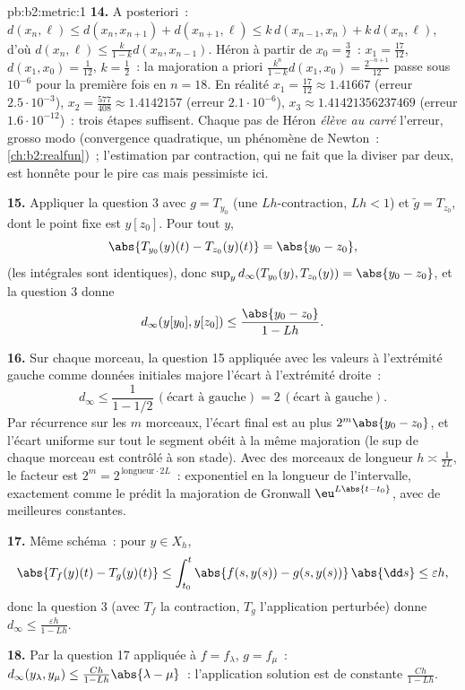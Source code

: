 \begin{solution}{pb:b2:metric:1}
\textbf{14.} A posteriori~: $d(x_n, \ell) \leq d(x_n, x_{n+1}) +
d(x_{n+1}, \ell) \leq k\,d(x_{n-1}, x_n) + k\,d(x_n, \ell)$, d'où
$d(x_n, \ell) \leq \frac{k}{1-k}d(x_n, x_{n-1})$. Héron à partir de
$x_0 = \frac32$~: $x_1 = \frac{17}{12}$, $d(x_1, x_0) = \frac1{12}$,
$k = \frac12$~: la majoration a priori $\frac{k^n}{1-k}d(x_1,x_0) =
\frac{2^{-n+1}}{12}$ passe sous $10^{-6}$ pour la première fois en $n
= 18$. En réalité $x_1 = \frac{17}{12} \approx 1.41667$ (erreur
$2.5\cdot10^{-3}$), $x_2 = \frac{577}{408} \approx 1.4142157$ (erreur
$2.1\cdot10^{-6}$), $x_3 \approx 1.41421356237469$ (erreur
$1.6\cdot10^{-12}$)~: trois étapes suffisent. Chaque pas de Héron
\emph{élève au carré} l'erreur, grosso modo (convergence quadratique,
un phénomène de Newton~: \cref{ch:b2:realfun})~; l'estimation par
contraction, qui ne fait que la diviser par deux, est honnête pour le
pire cas mais pessimiste ici.

\textbf{15.} Appliquer la question 3 avec $g = T_{y_0}$ (une
$Lh$-contraction, $Lh < 1$) et $\widetilde g = T_{z_0}$, dont le
point fixe est $y[z_0]$. Pour tout $y$,
\[
\abs{T_{y_0}(y)(t) - T_{z_0}(y)(t)} = \abs{y_0 - z_0},
\]
(les intégrales sont identiques), donc $\sup_y
d_\infty(T_{y_0}(y), T_{z_0}(y)) = \abs{y_0 - z_0}$, et la question 3
donne
\[
d_\infty(y[y_0], y[z_0]) \leq \frac{\abs{y_0 - z_0}}{1 - Lh} .
\]

\textbf{16.} Sur chaque morceau, la question 15 appliquée avec les
valeurs à l'extrémité gauche comme données initiales majore l'écart à
l'extrémité droite~:
\[
d_\infty \leq \frac{1}{1 - 1/2}\,(\text{écart à gauche})
= 2\,(\text{écart à gauche}) .
\] Par
récurrence sur les $m$ morceaux, l'écart final est au plus
$2^m\abs{y_0 - z_0}$, et l'écart uniforme sur tout le segment obéit à
la même majoration (le sup de chaque morceau est contrôlé à son
stade). Avec des morceaux de longueur $h \asymp \frac1{2L}$, le
facteur est $2^m = 2^{\,\text{longueur}\cdot 2L}$~: exponentiel en la
longueur de l'intervalle, exactement comme le prédit la majoration de
Gronwall $\eu^{L\abs{t-t_0}}$, avec de meilleures constantes.

\textbf{17.} Même schéma~: pour $y \in X_h$,
\[
\abs{T_f(y)(t) - T_g(y)(t)} \leq \int_{t_0}^t \abs{f(s,y(s)) -
g(s,y(s))}\,\abs{\dd s} \leq \varepsilon h ,
\]
donc la question 3 (avec $T_f$ la contraction, $T_g$ l'application
perturbée) donne $d_\infty \leq \frac{\varepsilon h}{1 - Lh}$.

\textbf{18.} Par la question 17 appliquée à $f = f_\lambda$, $g =
f_\mu$~: $d_\infty(y_\lambda, y_\mu) \leq \frac{Ch}{1 -
Lh}\abs{\lambda - \mu}$~: l'application solution est 
de constante $\frac{Ch}{1-Lh}$.


\end{solution}
